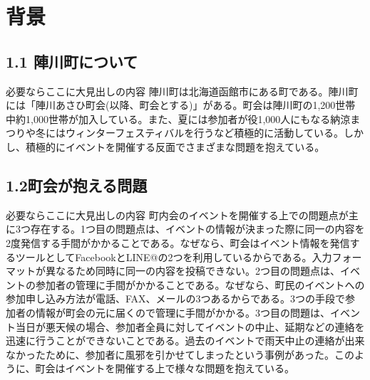 \chapter{背景}

\section{1.1 陣川町について}%
必要ならここに大見出しの内容
陣川町は北海道函館市にある町である。陣川町には「陣川あさひ町会(以降、町会とする)」がある。町会は陣川町の1,200世帯中約1,000世帯が加入している。また、夏には参加者が役1,000人にもなる納涼まつりや冬にはウィンターフェスティバルを行うなど積極的に活動している。しかし、積極的にイベントを開催する反面でさまざまな問題を抱えている。

\section{1.2町会が抱える問題}%
必要ならここに大見出しの内容
町内会のイベントを開催する上での問題点が主に3つ存在する。1つ目の問題点は、イベントの情報が決まった際に同一の内容を2度発信する手間がかかることである。なぜなら、町会はイベント情報を発信するツールとしてFacebookとLINE@の2つを利用しているからである。入力フォーマットが異なるため同時に同一の内容を投稿できない。2つ目の問題点は、イベントの参加者の管理に手間がかかることである。なぜなら、町民のイベントへの参加申し込み方法が電話、FAX、メールの3つあるからである。3つの手段で参加者の情報が町会の元に届くので管理に手間がかかる。3つ目の問題は、イベント当日が悪天候の場合、参加者全員に対してイベントの中止、延期などの連絡を迅速に行うことができないことである。過去のイベントで雨天中止の連絡が出来なかったために、参加者に風邪を引かせてしまったという事例があった。このように、町会はイベントを開催する上で様々な問題を抱えている。

